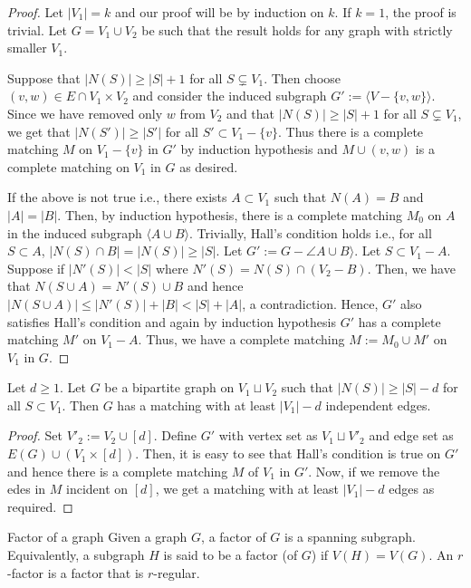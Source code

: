 \documentclass[../basic_graph_theory.tex]{subfiles}
\begin{document}
\begin{proof}
    Let $|V_1| = k$ and our proof will be by induction on $k$. If $k = 1$, the proof is trivial. Let $G = V_1 \cup V_2$ be such that the result holds for any graph with strictly smaller $V_1$.
    
    Suppose that $|N(S)| \geq |S| + 1$ for all $S \subsetneq V_1$. Then choose $(v,w) \in E \cap V_1 \times V_2$ and consider the induced subgraph $G' := \langle V - \{v,w\} \rangle$. Since we have removed only $w$ from $V_2$ and that $|N(S)| \geq |S| + 1$ for all $S \subsetneq V_1$, we get that $|N(S')| \geq |S'|$ for all $S' \subset V_1 - \{v\}$. Thus there is a complete matching $M$ on $V_1 - \{v\}$ in $G'$ by induction hypothesis and $M \cup (v,w)$ is a complete matching on $V_1$ in $G$ as desired.

    If the above is not true i.e., there exists $A \subset V_1$ such that $N(A) = B$ and $|A| = |B|$. Then, by induction hypothesis, there is a complete matching $M_0$ on $A$ in the induced subgraph $\langle A \cup B \rangle$. Trivially,  Hall's condition holds i.e., for all $S \subset A$,  $|N(S) \cap B| =  |N(S)| \geq |S|$. Let $G' := G - \angle  A \cup B \rangle$.  Let $S \subset V_1 - A$.  Suppose if $|N'(S)| < |S|$ where $N'(S) = N(S) \cap (V_2 - B)$.  Then,  we have that $N(S \cup A) = N'(S) \cup B$ and hence $|N(S \cup A)| \leq |N'(S)| + |B| < |S| + |A|$,  a contradiction.  Hence, $G'$ also satisfies Hall's condition and again by induction hypothesis $G'$ has a complete matching $M'$ on $V_1 -A$. Thus, we have a complete matching $M := M_0 \cup M'$ on $V_1$ in $G$.
\end{proof}

\begin{prop}
    Let $d \geq 1$. Let $G$ be a bipartite graph on $V_1 \sqcup V_2$ such that $|N(S)| \geq |S| - d$ for all $S \subset V_1$. Then $G$ has a matching with at least $|V_1| - d$ independent edges.
\end{prop}

\begin{proof}
    Set $V'_2 := V_2 \cup [d]$. Define $G'$ with vertex set as $V_1 \sqcup V'_2$ and edge set as $E(G) \cup (V_1 \times [d])$. Then, it is easy to see that Hall's condition is true on $G'$ and hence there is a complete matching $M$ of $V_1$ in $G'$. Now, if we remove the edes in $M$ incident on $[d]$, we get a matching with at least $|V_1| - d$ edges as required.
\end{proof}

\begin{Def}{Factor of a graph}{}
    Given a graph $G$,  a factor of $G$ is a spanning subgraph.  Equivalently,  a subgraph $H$ is said to be a factor (of $G$) if $V(H) = V(G)$. An $r$-factor is a factor that is $r$-regular.
\end{Def}
\end{document}
